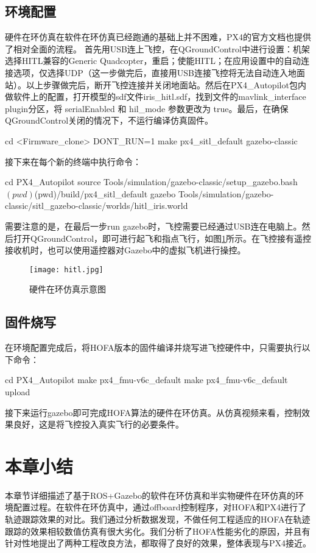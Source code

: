 \subsection*{环境配置}
硬件在环仿真在软件在环仿真已经跑通的基础上并不困难，PX4的官方文档也提供了相对全面的流程\cite{px4}。
首先用USB连上飞控，在QGroundControl中进行设置：机架选择HITL兼容的Generic Quadcopter，重启；使能HITL；在应用设置中的自动连接选项，仅选择UDP（这一步做完后，直接用USB连接飞控将无法自动连入地面站）。以上步骤做完后，断开飞控连接并关闭地面站。然后在PX4\_Autopilot包内做软件上的配置\cite{px4}，打开模型的sdf文件iris\_hitl.sdf，找到文件的mavlink\_interface plugin分区，将 serialEnabled 和 hil\_mode 参数更改为 true。最后，在确保QGroundControl关闭的情况下，不运行编译仿真固件。
\begin{codeblock}[language=C]
  cd <Firmware_clone>
  DONT_RUN=1 make px4_sitl_default gazebo-classic
\end{codeblock}
接下来在每个新的终端中执行命令：
\begin{codeblock}[language=C]
  cd PX4_Autopilot
  source Tools/simulation/gazebo-classic/setup_gazebo.bash $(pwd) $(pwd)/build/px4_sitl_default
  gazebo Tools/simulation/gazebo-classic/sitl_gazebo-classic/worlds/hitl_iris.world
\end{codeblock}
需要注意的是，在最后一步run gazebo时，飞控需要已经通过USB连在电脑上。然后打开QGroundControl，即可进行起飞和指点飞行，如图\ref{hitl}所示。在飞控接有遥控接收机时，也可以使用遥控器对Gazebo中的虚拟飞机进行操控。
\begin{figure}[!h]
  \centering
  \texttt{[image: hitl.jpg]}
  \caption{硬件在环仿真示意图}
  \label{hitl}
\end{figure}
\subsection*{固件烧写}
在环境配置完成后，将HOFA版本的固件编译并烧写进飞控硬件中，只需要执行以下命令：
\begin{codeblock}[language=C]
  cd PX4_Autopilot
  make px4_fmu-v6c_default
  make px4_fmu-v6c_default upload
\end{codeblock}
接下来运行gazebo即可完成HOFA算法的硬件在环仿真。从仿真视频来看，控制效果良好，这是将飞控投入真实飞行的必要条件。
\section{本章小结}
本章节详细描述了基于ROS+Gazebo的软件在环仿真和半实物硬件在环仿真的环境配置过程。在软件在环仿真中，通过offboard控制程序，对HOFA和PX4进行了轨迹跟踪效果的对比。我们通过分析数据发现，不做任何工程适应的HOFA在轨迹跟踪的效果相较数值仿真有很大劣化。我们分析了HOFA性能劣化的原因，并且有针对性地提出了两种工程改良方法，都取得了良好的效果，整体表现与PX4接近。